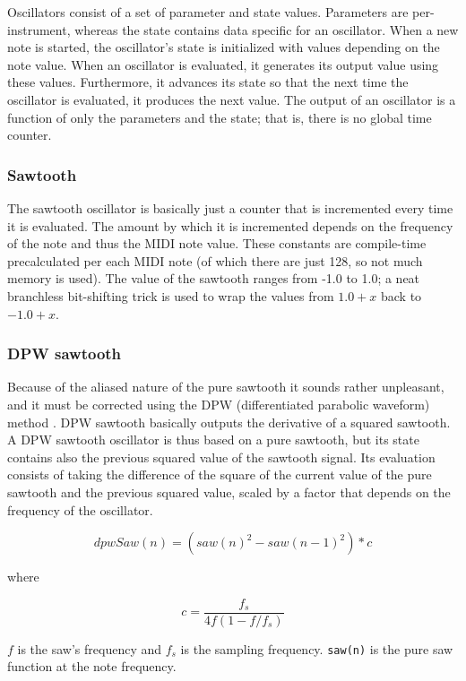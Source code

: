 \documentclass[10pt,a4paper,oneside]{article}
\begin{document}
Oscillators consist of a set of parameter and state values. Parameters are per-instrument, whereas the state contains data specific for an oscillator. When a new note is started, the oscillator's state is initialized with values depending on the note value. When an oscillator is evaluated, it generates its output value using these values. Furthermore, it advances its state so that the next time the oscillator is evaluated, it produces the next value. The output of an oscillator is a function of only the parameters and the state; that is, there is no global time counter.

\subsubsection{Sawtooth}

The sawtooth oscillator is basically just a counter that is incremented every time it is evaluated. The amount by which it is incremented depends on the frequency of the note and thus the MIDI note value. These constants are compile-time precalculated per each MIDI note (of which there are just 128, so not much memory is used). The value of the sawtooth ranges from -1.0 to 1.0; a neat branchless bit-shifting trick is used to wrap the values from $1.0+x$ back to $-1.0+x$.

\subsubsection{DPW sawtooth}

Because of the aliased nature of the pure sawtooth it sounds rather unpleasant, and it must be corrected using the DPW (differentiated parabolic waveform) method \cite{algos}. DPW sawtooth basically outputs the derivative of a squared sawtooth. A DPW sawtooth oscillator is thus based on a pure sawtooth, but its state contains also the previous squared value of the sawtooth signal. Its evaluation consists of taking the difference of the square of the current value of the pure sawtooth and the previous squared value, scaled by a factor that depends on the frequency of the oscillator.

\[
  dpwSaw(n) = (saw(n)^2 - saw(n-1)^2) * c
\]

where

\[
  c = \frac{f_s}{4 f (1 - f/f_s)}
\]

$f$ is the saw's frequency and $f_s$ is the sampling frequency. \verb|saw(n)| is the pure saw function at the note frequency.
\end{document}
